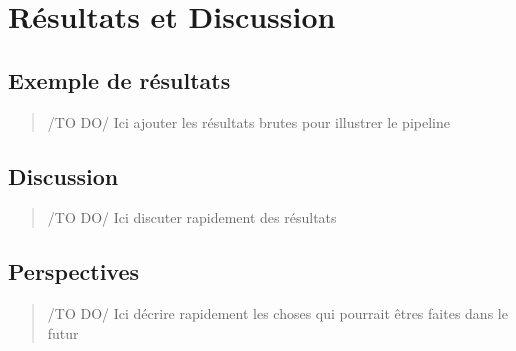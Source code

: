 \chapter{Résultats et Discussion}
\section{Exemple de résultats}
\begin{quote}
    /TO DO/ Ici ajouter les résultats brutes pour illustrer le pipeline
\end{quote}

\section{Discussion}
\begin{quote}
    /TO DO/ Ici discuter rapidement des résultats
\end{quote}

\section{Perspectives}
\begin{quote}
    /TO DO/ Ici décrire rapidement les choses qui pourrait êtres faites dans le futur
\end{quote}
